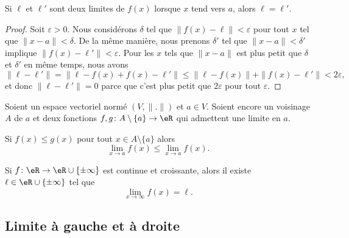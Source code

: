\begin{lemma}
	Si $\ell$ et $\ell'$ sont deux limites de $f(x)$ lorsque $x$ tend vers $a$, alors $\ell=\ell'$.
\end{lemma}

\begin{proof}
	Soit $\varepsilon>0$. Nous considérons $\delta$ tel que $\| f(x)-\ell \|<\varepsilon$ pour tout $x$ tel que $\| x-a \|<\delta$. De la même manière, nous prenons $\delta'$ tel que $\| x-a \|<\delta'$ implique $\| f(x)-\ell' \|<\varepsilon$. Pour les $x$ tels que $\| x-a \|$ est plus petit que $\delta$ et $\delta'$ en même temps, nous avons
	\begin{equation}
		\| \ell-\ell' \|=\| \ell-f(x)+f(x)-\ell' \|\leq\| \ell-f(x) \|+\| f(x)-\ell' \|<2\varepsilon,
	\end{equation}
	et donc $\| \ell-\ell' \|=0$ parce que c'est plus petit que $2\varepsilon$ pour tout $\varepsilon$.
\end{proof}

\begin{proposition}  \label{PROPooKPOXooEHIXJs}
	Soient un espace vectoriel normé \( (V,\| . \|)\) et \( a\in V\). Soient encore un voisinage \( A\) de \( a\) et deux fonctions \( f,g\colon A\setminus \{ a \}\to \eR\) qui admettent une limite en \( a\).

	Si \( f(x)\leq g(x)\) pour tout \( x\in A\setminus \{ a \}\) alors
	\begin{equation}
		\lim_{x\to a} f(x)\leq \lim_{x\to a}f(x).
	\end{equation}
\end{proposition}


\begin{proposition}     \label{PROPooGQHKooWgykjW}
	Si \( f\colon \eR\to \eR\cup\{ \pm\infty \}\) est continue et croissante, alors il existe \( \ell\in \eR\cup\{ \pm\infty \}\) tel que
	\begin{equation}
		\lim_{x\to \infty} f(x)=\ell.
	\end{equation}
\end{proposition}

\subsection{Limite à gauche et à droite}

